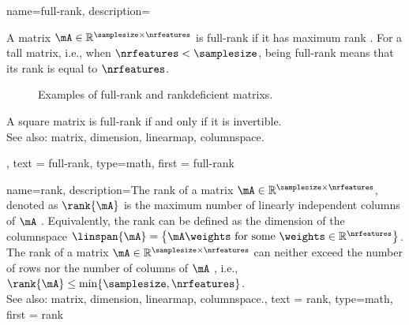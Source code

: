  {name={full-rank},
  description={A \gls{matrix} $\mA \in \mathbb{R}^{\samplesize \times \nrfeatures}$ 
  is full-rank if it has maximum \gls{rank} \cite{StrangLinAlg2016}. 
  For a tall \gls{matrix}, i.e., when $\nrfeatures < \samplesize$, being 
  full-rank means that its \gls{rank} is equal to $\nrfeatures$. 
 \begin{figure}[H]
\centering
{}
\caption{Examples of full-rank and \gls{rankdeficient} \glspl{matrix}.}
\end{figure} 
  A square matrix is full-rank if and 
  only if it is invertible. \\ 
  See also: \gls{matrix}, \gls{dimension}, \gls{linearmap}, \gls{columnspace}.}, 
  text = {full-rank}, 
  type=math,
  first = {full-rank} 
 }

{name={rank},
 description={The rank of a \gls{matrix} $\mA \in \mathbb{R}^{\samplesize \times \nrfeatures}$, 
 denoted as $\rank{\mA}$ is the maximum number of linearly independent columns 
 of $\mA$ \cite{StrangLinAlg2016}. Equivalently, the rank can be defined as the 
 \gls{dimension} of the \gls{columnspace} $\linspan{\mA} = \big\{ \mA \weights \mbox{ for some } 
 \weights \in \mathbb{R}^{\nrfeatures} \big\}$. The rank of a \gls{matrix} 
 $\mA \in \mathbb{R}^{\samplesize \times \nrfeatures}$ can neither exceed the 
 number of rows nor the number of columns of $\mA$ \cite{Horn91,MeyerMatrixAnalysis}, i.e., $\rank{\mA} \leq \min \{ \samplesize, \nrfeatures \}$.   \\ 
 See also: \gls{matrix}, \gls{dimension}, \gls{linearmap}, \gls{columnspace}.}, 
text = {rank}, 
type=math,
first = {rank} 
}

